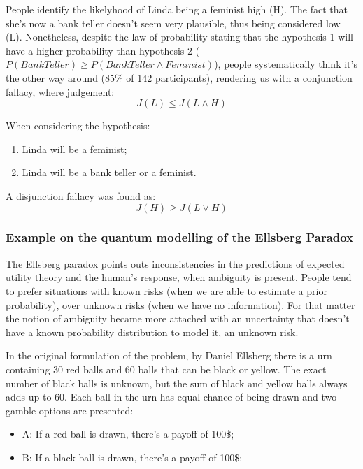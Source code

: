 People identify the likelyhood of Linda being a feminist high (H). The fact that she's now a bank teller doesn't seem very plausible, thus being considered low (L). Nonetheless, despite the law of probability stating that the hypothesis 1 will have a higher probability than hypothesis 2 ($P(Bank Teller) \geq P(Bank Teller \wedge Feminist)$), people systematically think it's the other way around (85\% of 142 participants), rendering us with a conjunction fallacy, where judgement:
\begin{equation}
J(L) \leq J(L \wedge H)
\end{equation}

When considering the hypothesis:
\begin{enumerate}
\item Linda will be a feminist;
\item Linda will be a bank teller or a feminist.
\end{enumerate}
A disjunction fallacy was found as:
\begin{equation}
J(H) \geq J(L \vee H)
\end{equation}




\subsubsection{Example on the quantum modelling of the Ellsberg Paradox}

The Ellsberg paradox points outs inconsistencies in the predictions of 
expected utility theory and the human's response, when ambiguity is present. 
People tend to prefer situations with known risks (when we are able to estimate a prior probability), over unknown risks (when we have no information). For 
that matter the notion of ambiguity became more attached with an uncertainty 
that doesn't have a known probability distribution to model it, an unknown 
risk.

In the original formulation of the problem, by Daniel Ellsberg \cite
{Ellsberg} there is a urn containing 30 red balls and 60 balls that can be 
black or yellow. The exact number of black balls is unknown, but the sum of 
black and yellow balls always adds up to 60. Each ball in the urn has equal 
chance of being drawn and two gamble options are presented:

\begin{itemize}
\item A: If a red ball is drawn, there's a payoff of 100\$;
\item B: If a black ball is drawn, there's a payoff of 100\$; 
\end{itemize}

